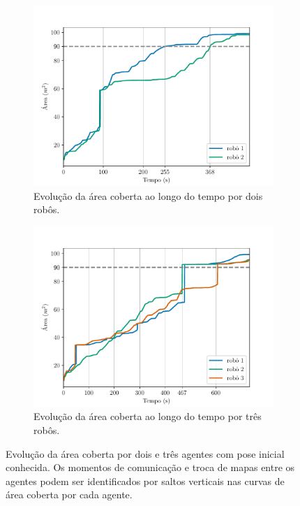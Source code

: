 \begin{figure}
  \centering
  \begin{subfigure}{0.49\textwidth}
    \includegraphics[width=\textwidth]{figs/area_coverage_two_robots-with-known-positions.pdf}
    \caption{Evolução da área coberta ao longo do tempo por dois robôs. 
    }
    \label{}
  \end{subfigure}
  \hfill
  \begin{subfigure}{0.49\textwidth}
    \includegraphics[width=\textwidth]{figs/area_coverage_three_robots-with-known-positions.pdf}
    \caption{Evolução da área coberta ao longo do tempo por três robôs. }
    \label{}
  \end{subfigure}
  \caption[Comparação da evolução das áreas cobertas por dois e três agentes com pose inicial conhecida]{Evolução da área coberta por dois e três agentes com pose inicial conhecida. Os momentos de comunicação e troca de mapas entre os agentes podem ser identificados por saltos verticais nas curvas de área coberta por cada agente.}
  \label{fig:know-initial-pose-area-coverage}
\end{figure}

